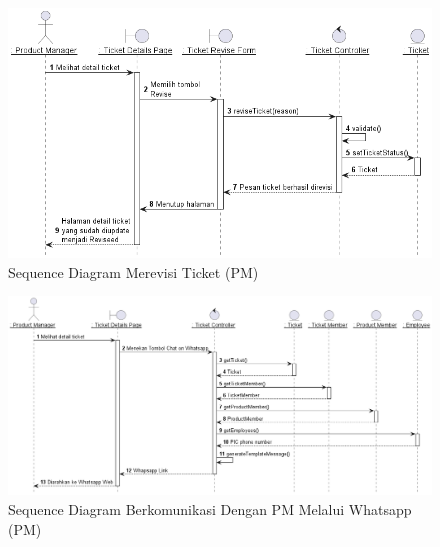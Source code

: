 \documentclass[12pt]{article}
\begin{document}
\begin{enumerate}[label=\textbf{4.\arabic*.}]
\begin{enumerate} [label=\textbf{4.2.\arabic*.}, wide, labelwidth=!, labelindent=0pt]
\begin{enumerate}[label=\textbf{4.2.2.\arabic*.}, wide, labelwidth=!, labelindent=0pt]
\begin{enumerate}[label=\arabic*.]
                \begin{figure}
                    \centering \includegraphics[width=\textwidth]{out/plantuml/sequence/ipm/ipm6/Merevisi Ticket.png}
                    \caption{Sequence Diagram Merevisi Ticket (PM)}
                    \label{fig:SQ-PM-06}
                \end{figure}

                \begin{figure}
                    \centering \includegraphics[width=\textwidth]{out/plantuml/sequence/ipm/ipm7/Berkomunikasi Dengan PIC Melalui Whatsapp.png}
                    \caption{Sequence Diagram Berkomunikasi Dengan PM Melalui Whatsapp (PM)}
                    \label{fig:SQ-PM-07}
                \end{figure}


\end{enumerate}
\end{enumerate}
\end{enumerate}
\end{enumerate}
\end{document}
